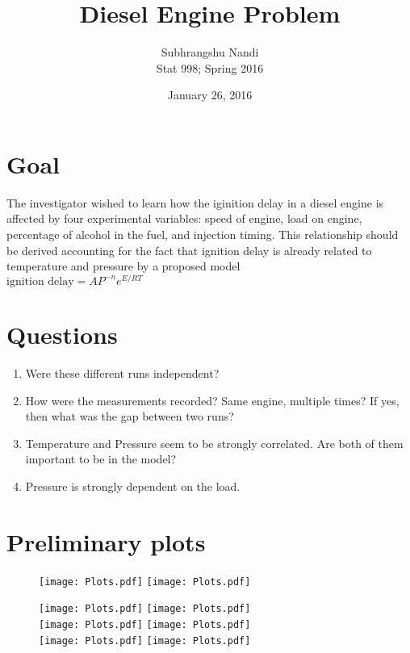 \documentclass[11pt,a4paper]{article}
\begin{document}
\title{Diesel Engine Problem}
\author{Subhrangshu Nandi\\
  Stat 998; Spring 2016}
\date{January 26, 2016}

\maketitle

\section*{Goal}
The investigator wished to learn how the iginition delay in a diesel engine is affected by four experimental variables: speed of engine, load on engine, percentage of alcohol in the fuel, and injection timing. This relationship should be derived accounting for the fact that ignition delay is already related to temperature and pressure by a proposed model \\
$\text{ignition delay} = AP^{-n}e^{E/RT}$

\section*{Questions}
\begin{enumerate}
\item Were these different runs independent?
\item How were the measurements recorded? Same engine, multiple times? If yes, then what was the gap between two runs?
\item Temperature and Pressure seem to be strongly correlated. Are both of them important to be in the model?
\item Pressure is strongly dependent on the load. 
\end{enumerate}

\section*{Preliminary plots}
\begin{figure}
\begin{center}
\texttt{[image: Plots.pdf]}
\texttt{[image: Plots.pdf]}
\end{center}
\end{figure}
\begin{figure}
\begin{center}
\texttt{[image: Plots.pdf]}
\texttt{[image: Plots.pdf]} \\
\texttt{[image: Plots.pdf]}
\texttt{[image: Plots.pdf]} \\
\texttt{[image: Plots.pdf]}
\texttt{[image: Plots.pdf]}
\end{center}
\end{figure}
\end{document}
